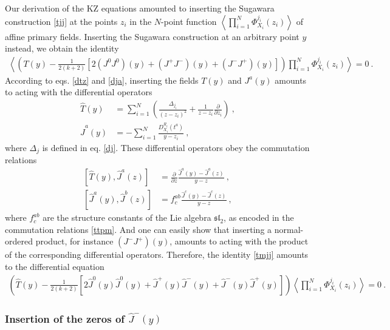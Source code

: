 \documentclass[12pt, a4paper, notitlepage, twoside]{report}
\numberwithin{equation}{section}
\theoremstyle{break}
\begin{document}
Our derivation of the KZ equations amounted to inserting the Sugawara construction \eqref{tjj}  at the points $z_i$ in the $N$-point function $\left\langle \prod_{i=1}^N \Phi^{j_i}_{X_i}(z_i)\right\rangle $ of affine primary fields.
Inserting the Sugawara construction at an arbitrary point $y$ instead, we obtain the identity
\begin{align}
 \left\langle \left(T(y)  - \frac{1}{2(k+2)}\left[ 2(J^0J^0)(y)+(J^+J^-)(y)+(J^-J^+)(y)\right]\right) \prod_{i=1}^N \Phi^{j_i}_{X_i}(z_i)\right\rangle = 0\ .
\label{tmjj}
\end{align}
According to eqs. \eqref{dtz} and \eqref{dja}, inserting the fields $T(y)$ and $J^a(y)$ amounts to acting with the differential operators 
\begin{align}
 \hat{T}(y) &= \sum_{i=1}^N \left(\frac{\Delta_{j_i}}{(z-z_i)^2} + \frac{1}{z-z_i}{\frac{\partial}{\partial z_i}}\right)\ ,
\label{tcy}
\\
 \hat{J}^a(y) &= - \sum_{i=1}^N \frac{D^{R_i}_{X_i}(t^a)}{y-z_i}\ ,
\label{jay}
\end{align}
where $\Delta_j$ is defined in eq. \eqref{dj}.
These differential operators obey the commutation relations
\begin{align}
 \left[\hat{T}(y),\hat{J}^a(z)\right] &= {\frac{\partial}{\partial z}} \frac{\hat{J}^a(y)-\hat{J}^a(z)}{y-z}\ ,
\label{dtd}
\\
 \left[ \hat{J}^a(y),\hat{J}^b(z)\right] &= f^{ab}_c \frac{\hat{J}^c(y)-\hat{J}^c(z)}{y-z}\ ,
\label{ddd}
\end{align}
where $f^{ab}_c$ are the structure constants of the Lie algebra $\mathfrak{sl}_2$, as encoded in the commutation relations \eqref{ttpm}.
And one can easily show that inserting a normal-ordered product, for instance $(J^-J^+)(y)$, amounts to acting with the product of the corresponding differential operators.
Therefore, the identity \eqref{tmjj} amounts to the differential equation
\begin{align}
 \left(\hat{T}(y) -\frac{1}{2(k+2)}\left[ 2\hat{J}^0(y)\hat{J}^0(y) +\hat{J}^+(y)\hat{J}^-(y)+\hat{J}^-(y)\hat{J}^+(y)\right]\right) \left\langle \prod_{i=1}^N \Phi^{j_i}_{X_i}(z_i)\right\rangle=0\ .
 \label{refkz}
\end{align}

\subsubsection{Insertion of the zeros of $\hat{J}^-(y)$}
\end{document}

